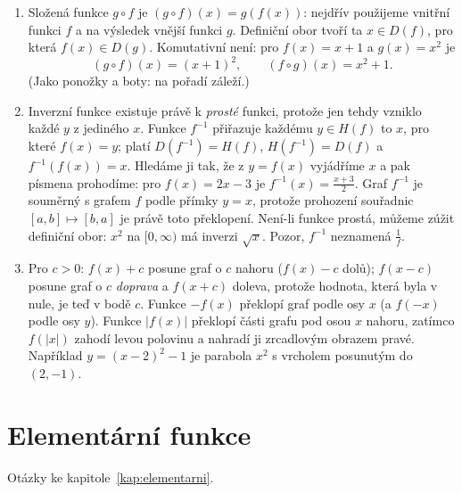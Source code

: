 \begin{enumerate}[label=\textbf{\arabic*.}, leftmargin=*, itemsep=0.8em]
  \item {}
  Složená funkce $g\circ f$ je $(g\circ f)(x) = g(f(x))$: nejdřív použijeme vnitřní funkci $f$ a na výsledek vnější funkci $g$. Definiční obor tvoří ta $x\in D(f)$, pro která $f(x)\in D(g)$. Komutativní není: pro $f(x) = x + 1$ a $g(x) = x^2$ je
  \begin{equation*}
    (g\circ f)(x) = {(x + 1)}^2, \qquad (f\circ g)(x) = x^2 + 1.
  \end{equation*}
  (Jako ponožky a boty: na pořadí záleží.) 

  \item {}
  Inverzní funkce existuje právě k \emph{prosté} funkci, protože jen tehdy vzniklo každé $y$ z jediného $x$. Funkce $f^{-1}$ přiřazuje každému $y\in H(f)$ to $x$, pro které $f(x) = y$; platí $D(f^{-1}) = H(f)$, $H(f^{-1}) = D(f)$ a $f^{-1}(f(x)) = x$. Hledáme ji tak, že z $y = f(x)$ vyjádříme $x$ a pak písmena prohodíme: pro $f(x) = 2x - 3$ je $f^{-1}(x) = \frac{x + 3}{2}$. Graf $f^{-1}$ je souměrný s grafem $f$ podle přímky $y = x$, protože prohození souřadnic $[a, b]\mapsto[b, a]$ je právě toto překlopení. Není-li funkce prostá, můžeme zúžit definiční obor: $x^2$ na $[0, \infty)$ má inverzi $\sqrt{x}$. Pozor, $f^{-1}$ neznamená $\frac{1}{f}$. 

  \item {}
  Pro $c > 0$: $f(x) + c$ posune graf o $c$ nahoru ($f(x) - c$ dolů); $f(x - c)$ posune graf o $c$ \emph{doprava} a $f(x + c)$ doleva, protože hodnota, která byla v nule, je teď v bodě $c$. Funkce $-f(x)$ překlopí graf podle osy $x$ (a $f(-x)$ podle osy $y$). Funkce $|f(x)|$ překlopí části grafu pod osou $x$ nahoru, zatímco $f(|x|)$ zahodí levou polovinu a nahradí ji zrcadlovým obrazem pravé. Například $y = {(x - 2)}^2 - 1$ je parabola $x^2$ s vrcholem posunutým do $(2, -1)$. 
\end{enumerate}

\section{Elementární funkce}

Otázky ke kapitole~\ref{kap:elementarni}.

